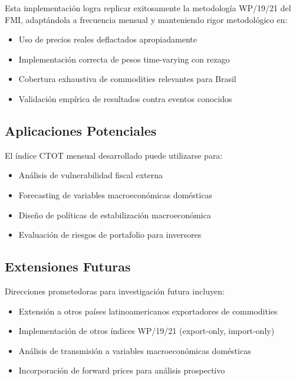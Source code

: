 \documentclass[12pt,a4paper]{article}
\begin{document}
Esta implementación logra replicar exitosamente la metodología WP/19/21 del FMI, adaptándola a frecuencia mensual y manteniendo rigor metodológico en:

\begin{itemize}
    \item Uso de precios reales deflactados apropiadamente
    \item Implementación correcta de pesos time-varying con rezago
    \item Cobertura exhaustiva de commodities relevantes para Brasil
    \item Validación empírica de resultados contra eventos conocidos
\end{itemize}

\subsection{Aplicaciones Potenciales}

El índice CTOT mensual desarrollado puede utilizarse para:

\begin{itemize}
    \item Análisis de vulnerabilidad fiscal externa
    \item Forecasting de variables macroeconómicas domésticas
    \item Diseño de políticas de estabilización macroeconómica
    \item Evaluación de riesgos de portafolio para inversores
\end{itemize}

\subsection{Extensiones Futuras}

Direcciones prometedoras para investigación futura incluyen:

\begin{itemize}
    \item Extensión a otros países latinoamericanos exportadores de commodities
    \item Implementación de otros índices WP/19/21 (export-only, import-only)
    \item Análisis de transmisión a variables macroeconómicas domésticas
    \item Incorporación de forward prices para análisis prospectivo
\end{itemize}
\end{document}
